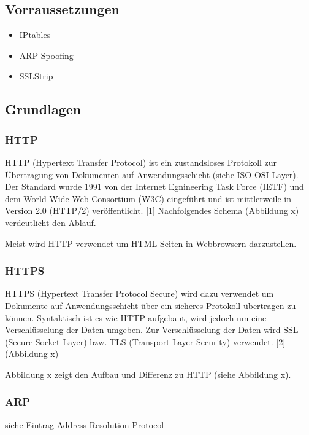 \subsection*{Vorraussetzungen}

\begin{itemize}
\item IPtables
\item ARP-Spoofing
\item SSLStrip
\end{itemize}


\subsection*{Grundlagen}

\subsubsection*{HTTP}
HTTP (Hypertext Transfer Protocol) ist ein zustandsloses Protokoll zur Übertragung von Dokumenten auf Anwendungsschicht (siehe ISO-OSI-Layer). Der Standard wurde 1991 von der Internet Egnineering
Task Force (IETF) und dem World Wide Web Consortium (W3C) eingeführt und ist mittlerweile in Version 2.0 (HTTP/2) veröffentlicht. [1]
Nachfolgendes Schema (Abbildung x) verdeutlicht den Ablauf.

Meist wird HTTP verwendet um HTML-Seiten in Webbrowsern darzustellen.

\subsubsection*{HTTPS}
HTTPS (Hypertext Transfer Protocol Secure) wird dazu verwendet um Dokumente auf Anwendungsschicht über ein sicheres Protokoll übertragen zu können. Syntaktisch ist es wie HTTP aufgebaut,
 wird jedoch um eine Verschlüsselung der Daten umgeben. Zur Verschlüsselung der Daten wird SSL (Secure Socket Layer) bzw. TLS (Transport Layer Security) verwendet. [2]
 (Abbildung x)
 
Abbildung x zeigt den Aufbau und Differenz zu HTTP (siehe Abbildung x).

\subsubsection*{ARP}
siehe Eintrag Address-Resolution-Protocol

